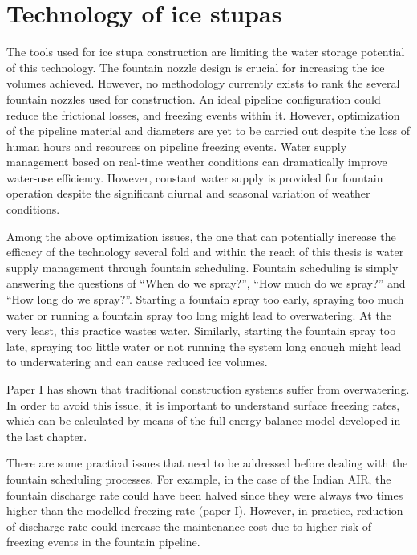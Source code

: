 \chapter{Technology of ice stupas}
\label{chap:tech}


The tools used for ice stupa construction are limiting the water storage potential of this technology. The
fountain nozzle design is crucial for increasing the ice volumes achieved. However, no methodology currently
exists to rank the several fountain nozzles used for construction. An ideal pipeline configuration could reduce
the frictional losses, and freezing events within it. However, optimization of the pipeline material and
diameters are yet to be carried out despite the loss of human hours and resources on pipeline freezing events.
Water supply management based on real-time weather conditions can dramatically improve water-use efficiency.
However, constant water supply is provided for fountain operation despite the significant diurnal and seasonal
variation of weather conditions.

Among the above optimization issues, the one that can potentially increase the efficacy of the technology
several fold and within the reach of this thesis is water supply management through fountain scheduling.
Fountain scheduling is simply answering the questions of “When do we spray?”, “How much do we spray?” and “How
long do we spray?”. Starting a fountain spray too early, spraying too much water or running a fountain spray too
long might lead to overwatering. At the very least, this practice wastes water.  Similarly, starting the
fountain spray too late, spraying too little water or not running the system long enough might lead to
underwatering and can cause reduced ice volumes.

Paper I has shown that traditional construction systems suffer from overwatering. In order to avoid this issue,
it is important to understand surface freezing rates, which can be calculated by means of the full energy
balance model developed in the last chapter.

There are some practical issues that need to be addressed before dealing with the fountain scheduling processes.
For example, in the case of the Indian AIR, the fountain discharge rate could have been halved since they were
always two times higher than the modelled freezing rate (paper I). However, in practice, reduction of discharge
rate could increase the maintenance cost due to higher risk of freezing events in the fountain pipeline.

